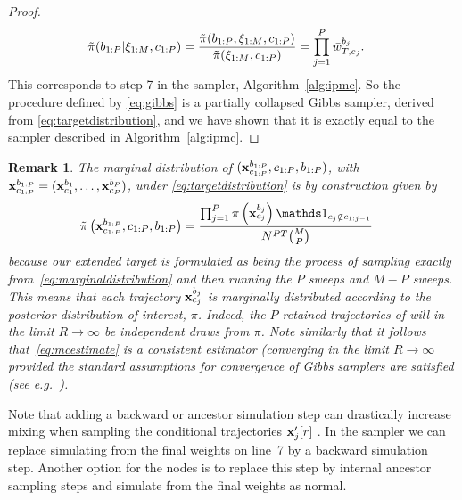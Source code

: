 \begin{proof}
	\begin{align*}
	&\tilde\pi(b_{1:P} | \mathbf{\xi}_{1:M}, c_{1:P}) = \frac{\tilde\pi(b_{1:P} ,\mathbf{\xi}_{1:M}, c_{1:P})}{\tilde\pi(\mathbf{\xi}_{1:M}, c_{1:P})} =  \prod_{j = 1}^P 
	\bar w_{T,c_j}^{b_j}
	.
	\end{align*}
	This corresponds to step 7 in the \ipmcmc sampler, Algorithm~\ref{alg:ipmc}. So the procedure defined by \eqref{eq:gibbs} is a partially collapsed Gibbs sampler, derived from \eqref{eq:targetdistribution}, and we have shown that it is exactly equal to the \ipmcmc sampler described in Algorithm~\ref{alg:ipmc}.
\end{proof}
\newtheorem{rem}{Remark}
\begin{rem}
	The marginal distribution of $(\mathbf{x}_{c_{1:P}}^{b_{1:P}},c_{1:P},b_{1:P})$, with $\mathbf{x}_{c_{1:P}}^{b_{1:P}} = (\mathbf{x}_{c_1}^{b_1},\ldots,\mathbf{x}_{c_P}^{b_P})$, under \eqref{eq:targetdistribution} is by construction given by
	\begin{align}
	\label{eq:marginaldistribution}
	&\tilde \pi\left(\xb_{c_{1:P}}^{b_{1:P}},c_{1:P},b_{1:P}\right) = \frac{\prod_{j = 1}^P \pi\left(\xb_{c_j}^{b_j}\right) \iden_{c_j \notin c_{1:j-1}}}{N^{PT} \binom{M}{P}}
	\end{align}
	because our extended target is formulated as being the process of sampling exactly from~\eqref{eq:marginaldistribution}
	and then running the $P$ \csmc sweeps and $M-P$ \smc sweeps.
	This means that each trajectory $\mathbf{x}_{c_j}^{b_j}$ is marginally distributed according to the
	posterior distribution of interest, $\pi$. Indeed, the $P$ retained trajectories of \ipmcmc
	will in the limit $R \rightarrow \infty$ %
	be independent draws from $\pi$.  Note similarly that it follows that~\eqref{eq:mcestimate}
	is a consistent estimator (converging in the limit $R\rightarrow\infty$ provided the standard
	assumptions for convergence of Gibbs samplers are satisfied (see e.g.~\citep{roberts1994simple}).
\end{rem}
Note that adding a backward or ancestor simulation step can drastically increase mixing when sampling the conditional trajectories $\mathbf{x}_j'[r]$ \citep{lindsten2013backward}. In the \ipmcmc sampler we can replace simulating from the final weights on line~7 by a backward simulation step. Another option for the \csmc nodes is to replace this step by internal ancestor sampling \citep{lindstenJS2014} steps and simulate from the final weights as normal.

